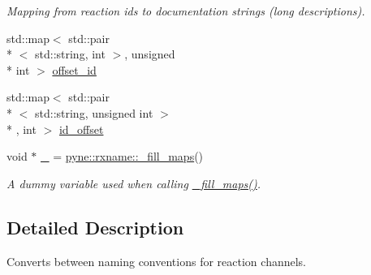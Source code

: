 \begin{DoxyCompactItemize}
\begin{DoxyCompactList}\small\item\em Mapping from reaction ids to documentation strings (long descriptions). \end{DoxyCompactList}\item 
std\-::map$<$ std\-::pair\\*
$<$ std\-::string, int $>$, unsigned \\*
int $>$ \hyperlink{namespacepyne_1_1rxname_a699be84310dad599582278e04135326e}{offset\-\_\-id}
\item 
std\-::map$<$ std\-::pair\\*
$<$ std\-::string, unsigned int $>$\\*
, int $>$ \hyperlink{namespacepyne_1_1rxname_ae2f5760c11dc39df3f90fbcc6584c95c}{id\-\_\-offset}
\item 
\hypertarget{namespacepyne_1_1rxname_ac59f8c4154e812420e0dfef0388a592b}{void $\ast$ \hyperlink{namespacepyne_1_1rxname_ac59f8c4154e812420e0dfef0388a592b}{\-\_\-} = \hyperlink{namespacepyne_1_1rxname_a4f97a2c91bfc51caf1e34eb21ed6c290}{pyne\-::rxname\-::\-\_\-fill\-\_\-maps}()}\label{namespacepyne_1_1rxname_ac59f8c4154e812420e0dfef0388a592b}

\begin{DoxyCompactList}\small\item\em A dummy variable used when calling \hyperlink{namespacepyne_1_1rxname_a4f97a2c91bfc51caf1e34eb21ed6c290}{\-\_\-fill\-\_\-maps()}. \end{DoxyCompactList}\end{DoxyCompactItemize}


\subsection{Detailed Description}
Converts between naming conventions for reaction channels. 

